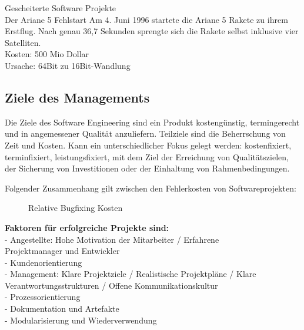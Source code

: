 Gescheiterte Software Projekte \\
Der Ariane 5 Fehlstart
Am 4. Juni 1996 startete die Ariane 5 Rakete zu ihrem Erstflug. Nach genau 36,7 Sekunden sprengte sich die Rakete selbst inklusive vier Satelliten. \\Kosten: 500 Mio Dollar \\
Ursache: 64Bit zu 16Bit-Wandlung

\subsection{Ziele des Managements}
Die Ziele des Software Engineering sind ein Produkt kostengünstig, termingerecht und in angemessener Qualität anzuliefern. Teilziele sind die Beherrschung von Zeit und Kosten. Kann ein unterschiedlicher Fokus gelegt werden: kostenfixiert, terminfixiert, leistungsfixiert, mit dem Ziel der Erreichung von Qualitätszielen, der Sicherung von Investitionen oder der Einhaltung von Rahmenbedingungen. 

Folgender Zusammenhang gilt zwischen den Fehlerkosten von Softwareprojekten:
\begin{figure}[hb]
	\centering
\caption[]{Relative Bugfixing Kosten}
\end{figure}
	
\textbf{Faktoren für erfolgreiche Projekte sind:} \\
- Angestellte: Hohe Motivation der Mitarbeiter / Erfahrene \\ Projektmanager und Entwickler \\
- Kundenorientierung \\
- Management: Klare Projektziele / Realistische Projektpläne / Klare Verantwortungsstrukturen / Offene Kommunikationskultur \\
- Prozessorientierung \\
- Dokumentation und Artefakte \\
- Modularisierung und Wiederverwendung



